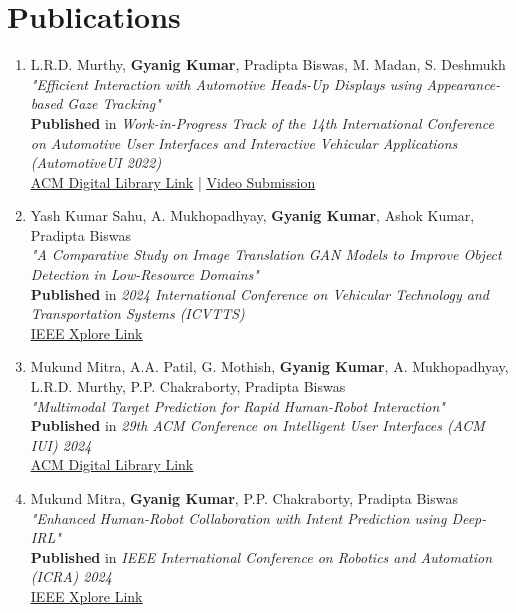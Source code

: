 \documentclass[letterpaper,10pt]{article}
\begin{document}
\section{Publications}
\begin{enumerate}
        
    \item {L.R.D. Murthy, \textbf{Gyanig Kumar}, Pradipta Biswas, M. Madan, S. Deshmukh\\
    \textit{"Efficient Interaction with Automotive Heads-Up Displays using Appearance-based Gaze Tracking"}\\
    \textbf{Published} in \textit{Work-in-Progress Track of the 14th International Conference on Automotive User Interfaces and Interactive Vehicular Applications (AutomotiveUI 2022)}\\
    \href{https://dl.acm.org/doi/pdf/10.1145/3544999.3554818}{\underline{ACM Digital Library Link}} | \href{https://www.youtube.com/watch?v=lqWYUUv88_U}{\underline{Video Submission}}}
    
    \item {Yash Kumar Sahu, A. Mukhopadhyay, \textbf{Gyanig Kumar}, Ashok Kumar, Pradipta Biswas\\
    \textit{"A Comparative Study on Image Translation GAN Models to Improve Object Detection in Low-Resource Domains"}\\
    \textbf{Published} in \textit{2024 International Conference on Vehicular Technology and Transportation Systems (ICVTTS)}\\
    \href{https://ieeexplore.ieee.org/document/10763945}{\underline{IEEE Xplore Link}}}
    
    \item {Mukund Mitra, A.A. Patil, G. Mothish, \textbf{Gyanig Kumar}, A. Mukhopadhyay, L.R.D. Murthy, P.P. Chakraborty, Pradipta Biswas\\
    \textit{"Multimodal Target Prediction for Rapid Human-Robot Interaction"}\\
    \textbf{Published} in \textit{29th ACM Conference on Intelligent User Interfaces (ACM IUI) 2024}\\
    \href{https://dl.acm.org/doi/abs/10.1145/3640544.3645229}{\underline{ACM Digital Library Link}}}
    
    \item {Mukund Mitra, \textbf{Gyanig Kumar}, P.P. Chakraborty, Pradipta Biswas\\
    \textit{"Enhanced Human-Robot Collaboration with Intent Prediction using Deep-IRL"}\\
    \textbf{Published} in \textit{IEEE International Conference on Robotics and Automation (ICRA) 2024}\\
    \href{https://ieeexplore.ieee.org/abstract/document/10610595}{\underline{IEEE Xplore Link}}}
    

\end{enumerate}
\end{document}
